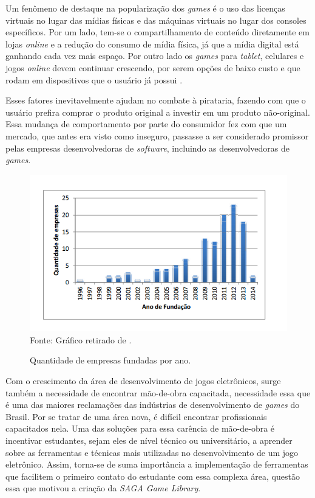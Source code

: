 
Um fenômeno de destaque na popularização dos \textit{games} é o uso das licenças virtuais no lugar das mídias físicas e das máquinas virtuais no lugar dos consoles específicos. Por um lado, tem-se o compartilhamento de conteúdo diretamente em lojas \textit{online} e a redução do consumo de mídia física, já que a mídia digital está ganhando cada vez mais espaço. Por outro lado os \textit{games} para \textit{tablet}, celulares e jogos \textit{online} devem continuar crescendo, por serem opções de baixo custo e que rodam em dispositivos que o usuário já possui \cite{ESTADAO}.

Esses fatores inevitavelmente ajudam no combate à pirataria, fazendo com que o usuário prefira comprar o produto original a investir em um produto não-original. Essa mudança de comportamento por parte do consumidor fez com que um mercado, que antes era visto como inseguro, passasse a ser considerado promissor pelas empresas desenvolvedoras de \textit{software}, incluindo as desenvolvedoras de \textit{games}.
%
%
%
\begin{figure}[h]
    \centering
    \caption{Quantidade de empresas fundadas por ano.}
    \label{AnoFundacaoEmpresas}
    \includegraphics[scale = 0.80]{Imagens/AnoFundacaoEmpresas.png}
    \\ Fonte: Gráfico retirado de \cite{GEDIGames}.
\end{figure}
%
%
%
\par
Com o crescimento da área de desenvolvimento de jogos eletrônicos, surge também a necessidade de encontrar mão-de-obra capacitada, necessidade essa que é uma das maiores reclamações das indústrias de desenvolvimento de \textit{games} do Brasil. Por se tratar de uma área nova, é difícil encontrar profissionais capacitados nela. Uma das soluções para essa carência de mão-de-obra é incentivar estudantes, sejam eles de nível técnico ou universitário, a aprender sobre as ferramentas e técnicas mais utilizadas no desenvolvimento de um jogo eletrônico. Assim, torna-se de suma importância a implementação de ferramentas que facilitem o primeiro contato do estudante com essa complexa área, questão essa que motivou a criação da \textit{SAGA Game Library}.
%
%
